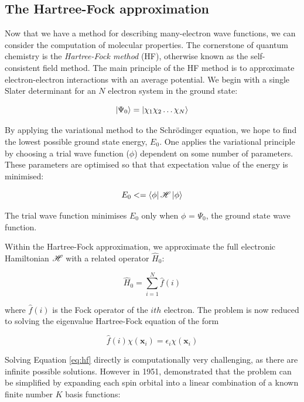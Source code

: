 \subsection{The Hartree-Fock approximation}

Now that we have a method for describing many-electron wave functions, we can consider the computation of molecular properties. The cornerstone of quantum chemistry is the \emph{Hartree-Fock method} (HF), otherwise known as the self-consistent field method. The main principle of the HF method is to approximate electron-electron interactions with an average potential. We begin with a single Slater determinant for an $N$ electron system in the ground state:

\begin{equation}
\ket{\Psi_0} = \ket{\chi_1\chi_2\dots\chi_N}
\end{equation}

\noindent By applying the variational method to the Schr{\"o}dinger equation, we hope to find the lowest possible ground state energy, $E_0$. One applies the variational principle by choosing a trial wave function ($\phi$) dependent on some number of parameters. These parameters are optimised so that that expectation value of the energy is minimised:

\begin{equation}
  E_0 <= \bra{\phi}\mathscr{H}\ket{\phi}
\end{equation}

\noindent The trial wave function minimises $E_0$ only when $\phi$ = $\Psi_0$, the ground state wave function.

Within the Hartree-Fock approximation, we approximate the full electronic Hamiltonian $\mathscr{H}$ with a related operator $\hat{H}_0$:

\begin{equation}
\hat{H}_0 = \sum_{i=1}^N \hat{f}(i)
\end{equation}

\noindent where $\hat{f}(i)$ is the Fock operator of the $ith$ electron.  The problem is now reduced to solving the eigenvalue Hartree-Fock equation of the form

\begin{equation}
\hat{f}(i)\chi(\mathbf{x}_i) = \epsilon_i\chi(\mathbf{x}_i)
\label{eq:hf}
\end{equation}

Solving Equation \ref{eq:hf} directly is computationally very challenging, as there are infinite possible solutions.  However in 1951, \citet{Roothaan1951} demonstrated that the problem can be simplified by expanding each spin orbital into a linear combination of a known finite number $K$ basis functions:

